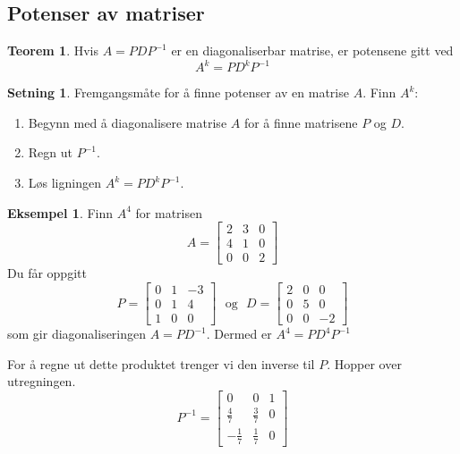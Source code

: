 \documentclass[11pt]{article}
\theoremstyle{definition}
\theoremstyle{definition}
\newtheorem{mitteks}{Eksempel}[section]
\theoremstyle{definition}
\newtheorem{minset}{Setning}[section]
\newenvironment{fminset}
{\begin{mdframed}[style=minstil]\begin{minset}}
		{\end{minset}\end{mdframed}}
\theoremstyle{definition}
\newtheorem{teo}{Teorem}[section]
\newenvironment{fteo}
{\begin{mdframed}[style=minstil]\begin{teo}}
		{\end{teo}\end{mdframed}}
\theoremstyle{definition}
\theoremstyle{definition}
\begin{document}
		\subsection{Potenser av matriser}
		
		\begin{fteo}
		Hvis \(A=PDP^{-1}\) er en diagonaliserbar matrise, er potensene gitt ved \[A^k=PD^kP^{-1}\]
		
		\end{fteo}
		
		\begin{fminset}
		Fremgangsmåte for å finne potenser av en matrise \(A\). Finn \(A^k\):
		\begin{enumerate}
			\item Begynn med å diagonalisere matrise \(A\) for å finne matrisene \(P\) og \(D\).
			\item Regn ut \(P^{-1}\).
			\item Løs ligningen \(A^k=PD^kP^{-1}\).
		\end{enumerate}
		\end{fminset}
		
		\begin{mitteks}
			Finn \(A^4\) for matrisen \[A=\left[\begin{array}{rrr} 
			2 & 3 & 0 \\
			4 & 1 & 0 \\
			0 & 0 & 2
			\end{array} \right]\]
			Du får oppgitt
			\[P=\left[\begin{array}{rrr} 
			0 & 1 & -3 \\
			0 & 1 & 4 \\
			1 & 0 & 0
			\end{array} \right] \hspace{8pt} \text{og} \hspace{8pt}
			D=\left[\begin{array}{rrr} 
			2 & 0 & 0 \\
			0 & 5 & 0 \\
			0 & 0 & -2
			\end{array} \right]
			\]
			som gir diagonaliseringen \(A=PD^{-1}\). Dermed er \(A^4=PD^4P^{-1}\)
		\end{mitteks}
		
		For å regne ut dette produktet trenger vi den inverse til \(P\). Hopper over utregningen.
		\renewcommand{\arraystretch}{1.3}
		\[P^{-1}=\left[\begin{array}{rrr} 
		0 & 0 & 1 \\
		\frac{4}{7} & \frac{3}{7} & 0 \\
		-\frac{1}{7} & \frac{1}{7} & 0
		\end{array} \right] \]
		\renewcommand{\arraystretch}{1}
		
\end{document}
